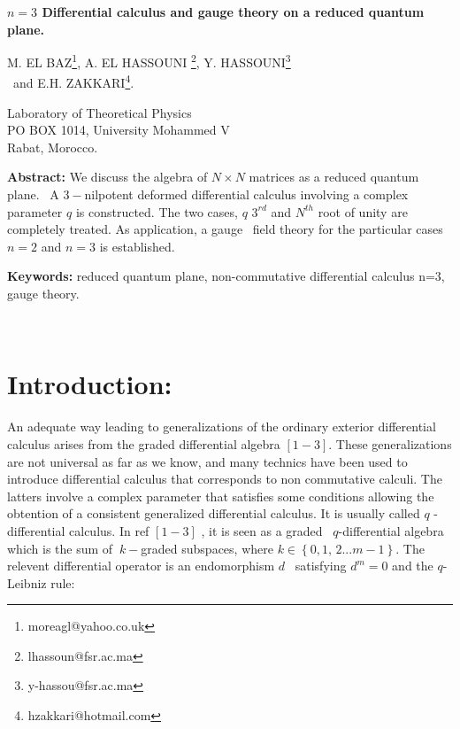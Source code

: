 \documentclass[a4paper,12pt,thmsa]{article}
\begin{document}
\begin{center}
{\LARGE \textbf{$n=3$ Differential calculus and gauge theory on a reduced
quantum plane.}}\\[0pt]\vspace{1cm}

\vspace{0.5cm}

\vspace{0.5cm}

{\large M. EL BAZ\footnote{{\large moreagl@yahoo.co.uk}}, A. EL HASSOUNI
\footnote{{\large lhassoun@fsr.ac.ma}}, Y. HASSOUNI\footnote{{\large %
y-hassou@fsr.ac.ma}}\\ \ and E.H. ZAKKARI\footnote{{\large %
hzakkari@hotmail.com}}.}\\[0pt]\vspace{0.5cm}\vspace{0.5cm}

Laboratory of Theoretical Physics\\[0pt]PO BOX 1014, University Mohammed V %
\\[0pt]Rabat, Morocco.
\end{center}

\bigskip

\vspace {2cm}

\textbf{Abstract:} We discuss the algebra of $N\times N$ matrices as a
reduced quantum plane. \ A $3-$nilpotent deformed differential calculus
involving a complex parameter $q$ is constructed. The two cases, $q$ $3^{rd}$
and $N^{th}$ root of unity are completely treated. As application, a gauge \
field theory for the particular cases $n=2$ and $n=3$ is established.\

\vspace {2cm}

\textbf{Keywords:} reduced quantum plane, non-commutative differential
calculus n=3, gauge theory.

\newpage\

\section{Introduction:}

An adequate way leading to generalizations of the ordinary exterior
differential calculus arises from the graded differential algebra $\left[
1-3\right] $. These generalizations are not universal as far as we know, and
many technics have been used to introduce differential calculus that
corresponds to non commutative calculi. The latters involve a complex
parameter that satisfies some conditions allowing the obtention of a
consistent generalized differential calculus. It is usually called $q$%
-differential calculus. In ref $\left[ 1-3\right] $ , it is seen
as a graded \ $q$-differential algebra which is the sum of $\
k-$graded subspaces, where $k\in \left\{ 0,1,\, 2...m-1\right\} .$
The relevent differential operator is an endomorphism $d$ \
satisfying $d^m=0$ and the $q$-Leibniz rule:
\end{document}
